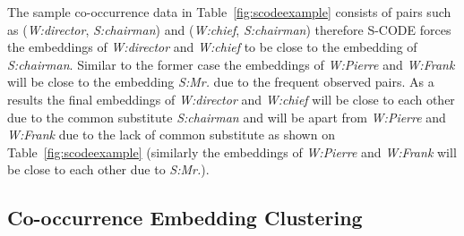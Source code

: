 
The sample co-occurrence data in Table~\ref{fig:scodeexample} consists
of pairs such as (\textit{W:director}, \textit{S:chairman}) and
(\textit{W:chief}, \textit{S:chairman}) therefore S-CODE forces the
embeddings of \textit{W:director} and \textit{W:chief} to be close to
the embedding of \textit{S:chairman}.  Similar to the former case the
embeddings of \textit{W:Pierre} and \textit{W:Frank} will be close to
the embedding \textit{S:Mr.} due to the frequent observed pairs.  As a
results the final embeddings of \textit{W:director} and
\textit{W:chief} will be close to each other due to the common
substitute \textit{S:chairman} and will be apart from \textit{W:Pierre}
and \textit{W:Frank} due to the lack of common substitute as shown on
Table~\ref{fig:scodeexample} (similarly the embeddings of
\textit{W:Pierre} and \textit{W:Frank} will be close to each other due
to \textit{S:Mr.}).


\subsection{Co-occurrence Embedding Clustering}


